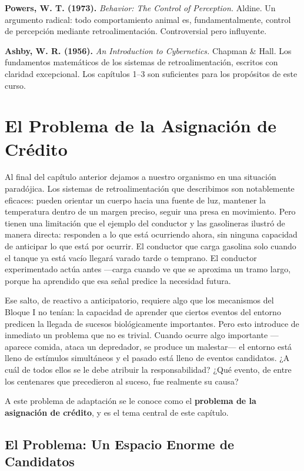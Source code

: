 \documentclass[
  letterpaper,
  DIV=11,
  numbers=noendperiod]{scrreprt}
\begin{document}
\begin{tcolorbox}[enhanced jigsaw, arc=.35mm, bottomrule=.15mm, breakable, colback=white, colframe=quarto-callout-note-color-frame, left=2mm, leftrule=.75mm, opacityback=0, rightrule=.15mm, toprule=.15mm]
\textbf{Powers, W. T. (1973).} \emph{Behavior: The Control of
Perception.} Aldine. Un argumento radical: todo comportamiento animal
es, fundamentalmente, control de percepción mediante retroalimentación.
Controversial pero influyente.

\textbf{Ashby, W. R. (1956).} \emph{An Introduction to Cybernetics.}
Chapman \& Hall. Los fundamentos matemáticos de los sistemas de
retroalimentación, escritos con claridad excepcional. Los capítulos 1--3
son suficientes para los propósitos de este curso.


\chapter{El Problema de la Asignación de
Crédito}\label{el-problema-de-la-asignaciuxf3n-de-cruxe9dito-1}

Al final del capítulo anterior dejamos a nuestro organismo en una
situación paradójica. Los sistemas de retroalimentación que describimos
son notablemente eficaces: pueden orientar un cuerpo hacia una fuente de
luz, mantener la temperatura dentro de un margen preciso, seguir una
presa en movimiento. Pero tienen una limitación que el ejemplo del
conductor y las gasolineras ilustró de manera directa: responden a lo
que está ocurriendo ahora, sin ninguna capacidad de anticipar lo que
está por ocurrir. El conductor que carga gasolina solo cuando el tanque
ya está vacío llegará varado tarde o temprano. El conductor
experimentado actúa antes ---carga cuando ve que se aproxima un tramo
largo, porque ha aprendido que esa señal predice la necesidad futura.

Ese salto, de reactivo a anticipatorio, requiere algo que los mecanismos
del Bloque I no tenían: la capacidad de aprender que ciertos eventos del
entorno predicen la llegada de sucesos biológicamente importantes. Pero
esto introduce de inmediato un problema que no es trivial. Cuando ocurre
algo importante ---aparece comida, ataca un depredador, se produce un
malestar--- el entorno está lleno de estímulos simultáneos y el pasado
está lleno de eventos candidatos. ¿A cuál de todos ellos se le debe
atribuir la responsabilidad? ¿Qué evento, de entre los centenares que
precedieron al suceso, fue realmente su causa?

A este problema de adaptación se le conoce como el \textbf{problema de
la asignación de crédito}, y es el tema central de este capítulo.

\section{El Problema: Un Espacio Enorme de
Candidatos}\label{el-problema-un-espacio-enorme-de-candidatos}


\end{tcolorbox}
\end{document}
